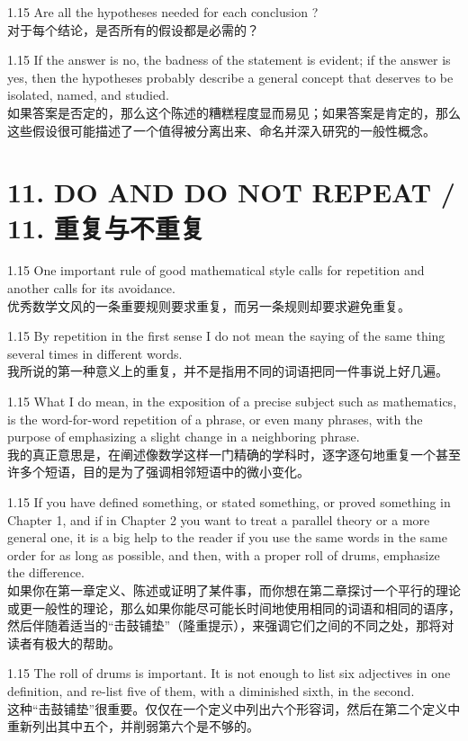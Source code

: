 \documentclass[12pt,a4paper]{article}
\newcommand{\bilingual}[2]{
    \begin{spacing}{1.15} %
        \noindent \normalsize #1 \\[-0.5ex] %
        \small \textcolor{blue!70!black}{#2} %
    \end{spacing}
    \vspace{0.8em} %
}
\begin{document}
\bilingual{Are all the hypotheses needed for each conclusion ?}
{对于每个结论，是否所有的假设都是必需的？} %

\bilingual{If the answer is no, the badness of the statement is evident; if the answer is yes, then the hypotheses probably describe a general concept that deserves to be isolated, named, and studied.}
{如果答案是否定的，那么这个陈述的糟糕程度显而易见；如果答案是肯定的，那么这些假设很可能描述了一个值得被分离出来、命名并深入研究的一般性概念。} %

\section*{11. DO AND DO NOT REPEAT / 11. 重复与不重复} %

\bilingual{One important rule of good mathematical style calls for repetition and another calls for its avoidance.}
{优秀数学文风的一条重要规则要求重复，而另一条规则却要求避免重复。} %

\bilingual{By repetition in the first sense I do not mean the saying of the same thing several times in different words.}
{我所说的第一种意义上的重复，并不是指用不同的词语把同一件事说上好几遍。} %

\bilingual{What I do mean, in the exposition of a precise subject such as mathematics, is the word-for-word repetition of a phrase, or even many phrases, with the purpose of emphasizing a slight change in a neighboring phrase.}
{我的真正意思是，在阐述像数学这样一门精确的学科时，逐字逐句地重复一个甚至许多个短语，目的是为了强调相邻短语中的微小变化。} %

\bilingual{If you have defined something, or stated something, or proved something in Chapter 1, and if in Chapter 2 you want to treat a parallel theory or a more general one, it is a big help to the reader if you use the same words in the same order for as long as possible, and then, with a proper roll of drums, emphasize the difference.}
{如果你在第一章定义、陈述或证明了某件事，而你想在第二章探讨一个平行的理论或更一般性的理论，那么如果你能尽可能长时间地使用相同的词语和相同的语序，然后伴随着适当的“击鼓铺垫”（隆重提示），来强调它们之间的不同之处，那将对读者有极大的帮助。} %

\bilingual{The roll of drums is important. It is not enough to list six adjectives in one definition, and re-list five of them, with a diminished sixth, in the second.}
{这种“击鼓铺垫”很重要。仅仅在一个定义中列出六个形容词，然后在第二个定义中重新列出其中五个，并削弱第六个是不够的。} %
\end{document}
